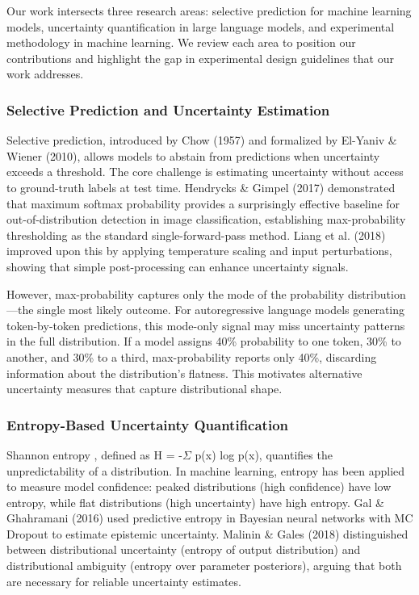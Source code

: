 
Our work intersects three research areas: selective prediction for machine learning models, uncertainty quantification in large language models, and experimental methodology in machine learning. We review each area to position our contributions and highlight the gap in experimental design guidelines that our work addresses.

\subsubsection{Selective Prediction and Uncertainty Estimation}

Selective prediction, introduced by Chow (1957) and formalized by El-Yaniv \& Wiener (2010), allows models to abstain from predictions when uncertainty exceeds a threshold. The core challenge is estimating uncertainty without access to ground-truth labels at test time. Hendrycks \& Gimpel (2017) demonstrated that maximum softmax probability provides a surprisingly effective baseline for out-of-distribution detection in image classification, establishing max-probability thresholding as the standard single-forward-pass method. Liang et al. (2018) improved upon this by applying temperature scaling and input perturbations, showing that simple post-processing can enhance uncertainty signals.

However, max-probability captures only the mode of the probability distribution---the single most likely outcome. For autoregressive language models generating token-by-token predictions, this mode-only signal may miss uncertainty patterns in the full distribution. If a model assigns 40\% probability to one token, 30\% to another, and 30\% to a third, max-probability reports only 40\%, discarding information about the distribution's flatness. This motivates alternative uncertainty measures that capture distributional shape.

\subsubsection{Entropy-Based Uncertainty Quantification}

Shannon entropy \citep{Shannon1948}, defined as H = -$\Sigma$ p(x) log p(x), quantifies the unpredictability of a distribution. In machine learning, entropy has been applied to measure model confidence: peaked distributions (high confidence) have low entropy, while flat distributions (high uncertainty) have high entropy. Gal \& Ghahramani (2016) used predictive entropy in Bayesian neural networks with MC Dropout to estimate epistemic uncertainty. Malinin \& Gales (2018) distinguished between distributional uncertainty (entropy of output distribution) and distributional ambiguity (entropy over parameter posteriors), arguing that both are necessary for reliable uncertainty estimates.

